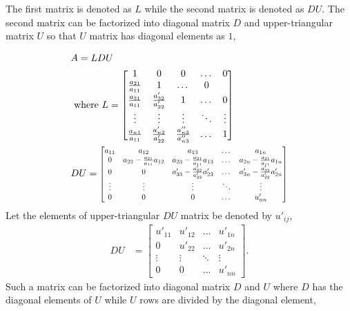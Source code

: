 \documentclass{article}
\begin{document}
% 
The  first  matrix is denoted   as  $L$   while the   second matrix  is  denoted
as $DU$.  The second  matrix    can  be   factorized into   diagonal matrix  $D$
and
upper-triangular matrix  $U$ so that $U$ matrix has diagonal elements as $1$,

\begin{align*}
  &A=LDU\\
  &\text{ where   } L =  \begin{bmatrix} 1  & 0  &  0 &  \dots  & 0 \\
    \frac{a_{21}}{a_{11}} & 1  & \dots  &   0  \\
    \frac{a_{31}}{a_{11}} & \frac{a'_{32}}{a'_{22}}  & 1 & \dots  &   0  \\
    \vdots  & \vdots &  \vdots  &   \ddots  &  \vdots   \\
    \frac{a_{n1}}{a_{11}} & \frac{a'_{n2}}{a'_{22}} &  \frac{a''_{n3}}{a''_{n3}}   &  \dots  & 1
  \end{bmatrix}\\
  &DU = \scalebox{0.8}{\mbox{$\begin{bmatrix}
        a_{11} & a_{12}  &  a_{13} &     \dots &  a_{1n} \\
        0 & a_{22}-\frac{a_{21}}{a_{11}}a_{12}  & a_{23}-\frac{a_{21}}{a_{11}}a_{13} &  \dots &  a_{2n} -\frac{a_{21}}{a_{11}}a_{1n}\\
        0 & 0 &  a'_{33}-\frac{a'_{32}}{a'_{22}}a'_{23} &     \dots &  a'_{3n}-\frac{a'_{32}}{a'_{22}}a'_{2n} \\
        \vdots &  \vdots  & \vdots &  \ddots & \vdots \\
        0 & 0  &  0&   \dots &  u'_{nn}
      \end{bmatrix}$}}
\end{align*}
% 
Let the elements of upper-triangular $DU$ matrix  be denoted  by $u'_{ij}$,
%
\begin{align*}
  DU &= \begin{bmatrix}
    u'_{11} & u'_{12}  &   \dots &  u'_{1n} \\
    0 & u'_{22}  &   \dots &  u'_{2n} \\
    \vdots &  \vdots  & \ddots & \vdots \\
    0 & 0  &   \dots &  u'_{nn}
      \end{bmatrix}.
\end{align*}
%
Such  a matrix  can be factorized into diagonal  matrix  $D$  and $U$
where $D$ has the diagonal elements of $U$ while  $U$  rows  are  divided  by
the  diagonal element,
%
\end{document}
